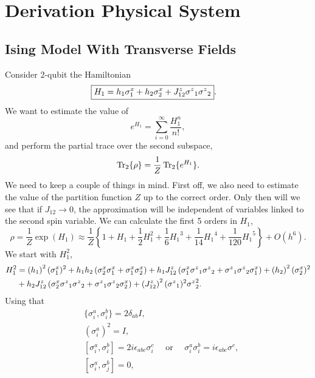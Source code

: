 
\chapter{Derivation Physical System} \label{sec:phys_sys}
\section{Ising Model With Transverse Fields}
Consider 2-qubit the Hamiltonian
\begin{align*}
    \Aboxed{H_1 &= h_1 {\sx_1} + h_2 {\sx_2} + J^{z}_{12} {\sz}_1 {\sz}_2}.
\end{align*}
We want to estimate the value of 
\begin{equation*}
    e^{H_1} = \sum_{i=0}^\infty \frac{H_1^n}{n!},
\end{equation*} 
and perform the partial trace over the second subspace,
\begin{equation*}
    \Tr_2\{\rho\} =  \frac{1}{Z}\Tr_2\{e^{H_1}\}.
\end{equation*}
We need to keep a couple of things in mind. First off, we also need to estimate the value of the partition function $Z$ up to the correct order. Only then will we see that if $J_{12}\to0$, the approximation will be independent of variables linked to the second spin variable. We can calculate the first 5 orders in $H_1$,
\begin{equation*}
    \rho = \frac{1}{Z}\exp(H_1) \approx \frac{1}{Z} \left\{1 + {H_1} + \frac{1}{2}H_1^2 + \frac{1}{6} {H_1}^3 + \frac{1}{14} {H_1}^4+ \frac{1}{120} {H_1}^5 \right\} + O(h^6) .
\end{equation*}
We start with $H_1^2$,
\begin{align*}
    H_1^2 & = \left(h_1\right)^{2} ({\sigma^{x}_1})^{2}  + h_1 h_2 \left({\sigma^{x}_2} {\sigma^{x}_1} + {\sigma^{x}_1} {\sigma^{x}_2}\right) + h_1 J^{z}_{12} \left({\sigma^{x}_1} {\sigma^{z}}_1 {\sigma^{z}}_2 + {\sigma^{z}}_1 {\sigma^{z}}_2 {\sigma^{x}_1}\right) + \left(h_2\right)^{2} ({\sigma^{x}_2})^{2} \\
    & + h_2 J^{z}_{12} \left({\sigma^{x}_2} {\sigma^{z}}_1 {\sigma^{z}}_2 + {\sigma^{z}}_1 {\sigma^{z}}_2 {\sigma^{x}_2}\right) + \left(J^{z}_{12}\right)^{2} ({\sigma^{z}}_1)^2 {\sigma^{z}}_2^{2}.
\end{align*}
Using that 
\begin{align}
    &\{\sigma^a_i, \sigma^b_i\}=2\delta_{ab}I,\\
    &(\sigma^a_i)^2=I,\\
    &[\sigma^a_i,\sigma^b_i] = 2i\epsilon_{abc}\sigma^c_i \quad \text{ or } \quad \sigma^a_i \sigma^b_i = i \epsilon_{abc} \sigma^c,\\
    &[\sigma^a_i,\sigma^b_j]=0,
\end{align} 
